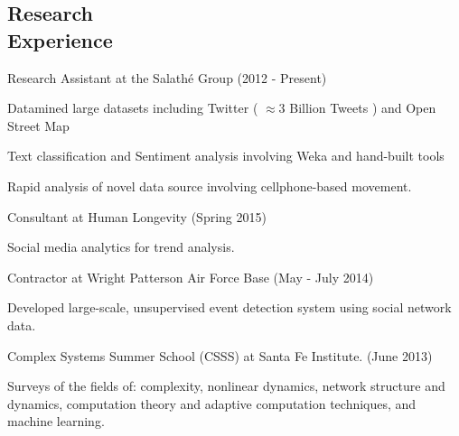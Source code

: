\documentclass[margin,line]{res}
\newenvironment{list1}{
  \begin{list}{\ding{113}}{%
      \setlength{\itemsep}{0in}
      \setlength{\parsep}{0in} \setlength{\parskip}{0in}
      \setlength{\topsep}{0in} \setlength{\partopsep}{0in} 
      \setlength{\leftmargin}{0.17in}}}{\end{list}}
\begin{document}
\begin{resume}
\section{\sc Research \\ Experience}
Research Assistant at the Salath\'e Group (2012 - Present)
\begin{list1}
\item[] Datamined large datasets including Twitter  ( \(\approx 3\) Billion Tweets ) and Open Street Map 
\item[] Text classification and Sentiment analysis involving Weka and hand-built tools
\item[] Rapid analysis of novel data source involving cellphone-based movement. %
\end{list1}

Consultant at Human Longevity (Spring 2015)
\begin{list1}
\item[] Social media analytics for trend analysis. 
\end{list1}

Contractor at Wright Patterson Air Force Base (May - July 2014)
\begin{list1}
\item[] Developed large-scale, unsupervised event detection system using social network data.
\end{list1}

Complex Systems Summer School (CSSS) at Santa Fe Institute. (June 2013)
\begin{list1}
\item[] Surveys of the fields of: complexity, nonlinear dynamics, network structure and dynamics, computation theory and adaptive computation techniques, and machine learning.
\end{list1}



\end{resume}
\end{document}
